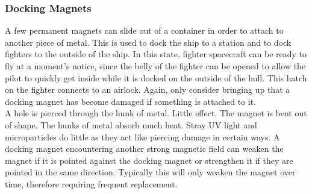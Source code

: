 \documentclass[a4paper]{article}
\begin{document}
\vspace{-0.5cm} \hspace{-18pt} \subsubsection{Docking Magnets} \label{outer_docking} \vspace{-0.2cm}
A few permanent magnets can slide out of a container in order to attach to another piece of metal. This is used to dock the ship to a station and to dock fighters to the outside of the ship. In this state, fighter spacecraft can be ready to fly at a moment's notice, since the belly of the fighter can be opened to allow the pilot to quickly get inside while it is docked on the outside of the hull. This hatch on the fighter connects to an airlock. Again, only consider bringing up that a docking magnet has become damaged if something is attached to it.
\\ \pbhw
{A hole is pierced through the hunk of metal. Little effect.}
{The magnet is bent out of shape. \newline {}}
{The hunks of metal absorb much heat.}
{Stray UV light and microparticles do little as they act like piercing damage in certain ways. \newline A docking magnet encountering another strong magnetic field can weaken the magnet if it is pointed against the docking magnet or strengthen it if they are pointed in the same direction. Typically this will only weaken the magnet over time, therefore requiring frequent replacement.}
\end{document}
